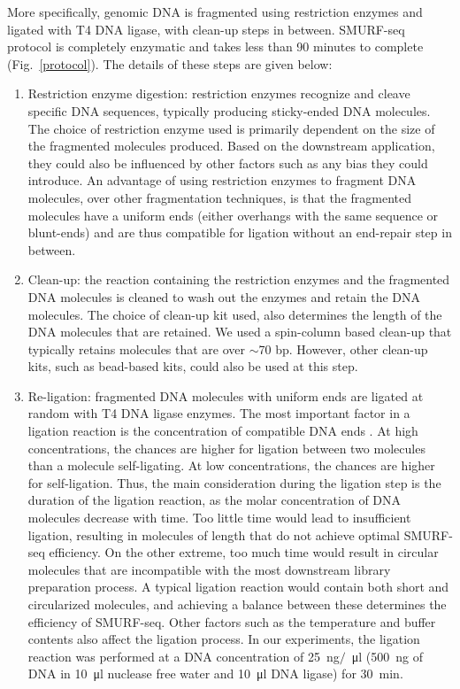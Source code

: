 More specifically, genomic DNA is fragmented using restriction enzymes
and ligated with T4 DNA ligase, with clean-up steps in between.
SMURF-seq protocol is completely enzymatic and takes less than 90
minutes to complete (Fig.~\ref{protocol}).  The details of these steps
are given below:
\begin{enumerate}
\item Restriction enzyme digestion: restriction enzymes recognize
  and cleave specific DNA sequences, typically producing sticky-ended DNA
  molecules.
  The choice of restriction enzyme used is primarily dependent on the
  size of the fragmented molecules produced. Based on the downstream
  application, they could also be influenced by other factors such as any
  bias they could introduce.
  An advantage of using restriction enzymes to fragment DNA molecules,
  over other fragmentation techniques, is that the fragmented molecules
  have a uniform ends (either overhangs with the same sequence or
  blunt-ends) and are thus compatible for ligation without an end-repair
  step in between.

\item Clean-up: the reaction containing the restriction
  enzymes and the fragmented DNA molecules is cleaned to wash out the
  enzymes and retain the DNA molecules. The choice of clean-up kit used, also
  determines the length of the DNA molecules that are retained. We used a
  spin-column based clean-up that typically retains molecules that are over
  $\sim$70 bp. However, other clean-up kits, such as bead-based kits,
  could also be used at this step.

\item Re-ligation: fragmented DNA molecules with uniform ends are
  ligated at random with T4 DNA ligase enzymes.
  The most important factor in a ligation reaction is the
  concentration of compatible DNA ends \cite{dugaiczyk1975ligation}. At
  high concentrations, the chances are higher for ligation between two
  molecules than a molecule self-ligating. At low concentrations, the
  chances are higher for self-ligation.
  Thus, the main consideration during the ligation step is the
  duration of the ligation reaction, as the molar concentration of DNA
  molecules decrease with time. Too little time would lead to insufficient
  ligation, resulting in molecules of length that do not achieve optimal
  SMURF-seq efficiency. On the other extreme, too much time would result
  in circular molecules that are incompatible with the most downstream
  library preparation process. A typical ligation reaction would contain
  both short and circularized molecules, and achieving a balance between
  these determines the efficiency of SMURF-seq.
  Other factors such as the temperature and buffer contents also affect
  the ligation process.
  In our experiments, the ligation reaction was performed at a DNA
  concentration of \SI{25}{\nano\gram}$/$\SI{}{\micro\litre}
  (\SI{500}{\nano\gram} of DNA in \SI{10}{\micro\litre} nuclease free
  water and \SI{10}{\micro\litre} DNA ligase) for \SI{30}{\minute}.


\end{enumerate}
